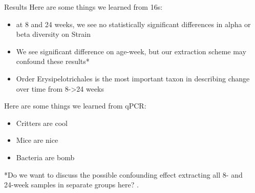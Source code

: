 \documentclass[final]{beamer}
\newlength{\sepwidth}
\newlength{\colwidth}
\newcommand{\separatorcolumn}{\begin{column}{\sepwidth}\end{column}}
\begin{document}
\begin{frame}[t]
\begin{columns}[t]
\separatorcolumn

\begin{column}{\colwidth}
    \begin{block}{Results}
      Here are some things we learned from 16s:
      \begin{itemize}
      \item at 8 and 24 weeks, we see no statistically significant differences in alpha or beta diversity on Strain
      \item We see significant difference on age-week, but our extraction scheme may confound these results*
      \item Order Erysipelotrichales is the most important taxon in describing change over time from 8->24 weeks
      \end{itemize}

      Here are some things we learned from qPCR:

      \begin{itemize}
        \item Critters are cool
        \item Mice are nice
        \item Bacteria are bomb
      \end{itemize}

    \begin{tcolorbox}
    [width=\textwidth, colframe=blue]
    {*Do we want to discuss the possible confounding effect extracting all 8- and 24-week samples in separate groups here? }.
    \end{tcolorbox}


\end{block}
\end{column}
\end{columns}
\end{frame}
\end{document}
